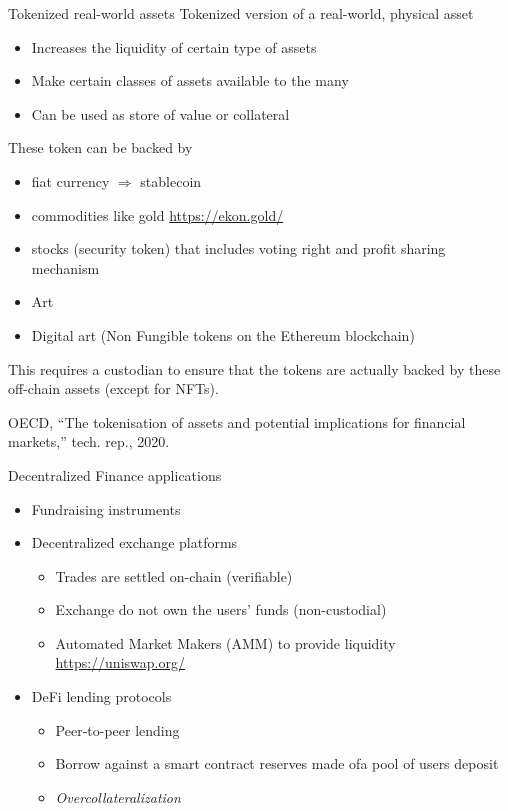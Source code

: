 \documentclass{beamer}
\begin{document}
\begin{frame}{Tokenized real-world assets}
\scriptsize
Tokenized version of a real-world, physical asset
\begin{itemize}
  \item Increases the liquidity of certain type of assets
  \item Make certain classes of assets available to the many
  \item Can be used as store of value or collateral
\end{itemize}
These token can be backed by 
\begin{itemize}
  \item fiat currency $\Rightarrow$ stablecoin
  \item commodities like gold \url{https://ekon.gold/}
  \item stocks (security token) that includes voting right and profit sharing mechanism
  \item Art
  \item Digital art (Non Fungible tokens on the Ethereum blockchain)
\end{itemize}
\begin{tcolorbox}[enhanced,drop shadow, title=Central authority]
    This requires a custodian to ensure that the tokens are actually backed by these off-chain assets (except for NFTs).
\end{tcolorbox}

\scriptsize
\begin{thebibliography}{1}

OECD, ``The tokenisation of assets and potential implications for financial
  markets,'' tech. rep., 2020.

\end{thebibliography}
\end{frame}

\begin{frame}{Decentralized Finance applications}
\small
\begin{itemize}
  \item Fundraising instruments
  \item Decentralized exchange platforms
  \begin{itemize}
    \item \scriptsize Trades are settled on-chain (verifiable)
    \item \scriptsize Exchange do not own the users' funds (non-custodial)
    \item \scriptsize Automated Market Makers (AMM) to provide liquidity \url{https://uniswap.org/}
  \end{itemize}
  \item DeFi lending protocols
  \begin{itemize}
    \item Peer-to-peer lending
    \item Borrow against a smart contract reserves made ofa pool of users deposit 
    \item \textit{Overcollateralization}

  \end{itemize}

\end{itemize}
\end{frame}
\end{document}
